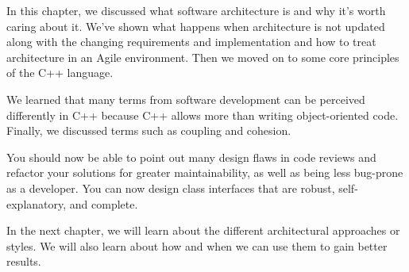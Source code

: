 In this chapter, we discussed what software architecture is and why it's worth caring about it. We've shown what happens when architecture is not updated along with the changing requirements and implementation and how to treat architecture in an Agile environment. Then we moved on to some core principles of the C++ language.

We learned that many terms from software development can be perceived differently in C++ because C++ allows more than writing object-oriented code. Finally, we discussed terms such as coupling and cohesion.

You should now be able to point out many design flaws in code reviews and refactor your solutions for greater maintainability, as well as being less bug-prone as a developer. You can now design class interfaces that are robust, self-explanatory, and complete.

In the next chapter, we will learn about the different architectural approaches or styles. We will also learn about how and when we can use them to gain better results. 